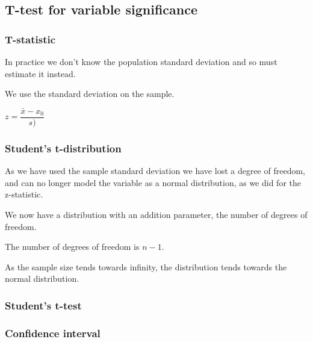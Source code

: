 
\subsection{T-test for variable significance}

\subsubsection{T-statistic}

In practice we don't know the population standard deviation and so must estimate it instead.

We use the standard deviation on the sample.

\(z=\dfrac{\bar x-x_0}{s) }\)

\subsubsection{Student's t-distribution}

As we have used the sample standard deviation we have lost a degree of freedom, and can no longer model the variable as a normal distribution, as we did for the z-statistic.

We now have a distribution with an addition parameter, the number of degrees of freedom.

The number of degrees of freedom is \(n-1\).

As the sample size tends towards infinity, the distribution tends towards the normal distribution.

\subsubsection{Student's t-test}

\subsubsection{Confidence interval}


